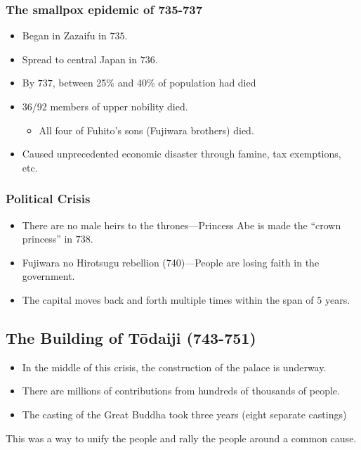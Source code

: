 \documentclass[class=article, crop=false]{standalone}
\begin{document}
  \subsubsection{The smallpox epidemic of 735-737}
  \begin{itemize}
    \item Began in Zazaifu in $735$.
    \item Spread to central Japan in $736$.
    \item By $737$, between 25\% and 40\% of population had died
    \item 36/92 members of upper nobility died.
    \begin{itemize}
      \item All four of Fuhito's sons (Fujiwara brothers) died.
    \end{itemize}
    \item Caused unprecedented economic disaster through famine, tax exemptions, etc.
  \end{itemize}
  \subsubsection{Political Crisis}
  \begin{itemize}
    \item There are no male heirs to the thrones---Princess Abe is made the ``crown princess'' in $738$.
    \item Fujiwara no Hirotsugu rebellion (740)---People are losing faith in the government.
    \item The capital moves back and forth multiple times within the span of $5$ years.
  \end{itemize}
  \subsection{The Building of T\=odaiji (743-751)}
  \begin{itemize}
    \item In the middle of this crisis, the construction of the palace is underway.
    \item There are millions of contributions from hundreds of thousands of people.
    \item The casting of the Great Buddha took three years (eight separate castings)
  \end{itemize}
  \begin{note}{}
    This was a way to unify the people and rally the people around a common cause.
  \end{note}
\end{document}
